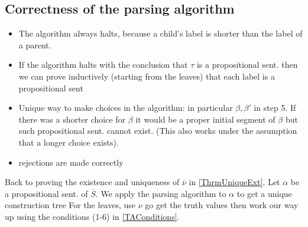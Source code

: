 \subsection*{Correctness of the parsing algorithm}
\begin{itemize}
    \item The algorithm always halts, because a child's label is shorter than the label of a parent.
    \item If the algorithm halts with the conclusion that $\tau$ is a propositional sent. 
    then we can prove inductively (starting from the leaves) that each label is a propositional sent
    \item Unique way to make choices in the algorithm: in particular $\beta, \beta'$ in step 5.
    If there was a shorter choice for $\beta$ it would be a proper initial segment of $\beta$ but such propositional sent. cannot exist.
    (This also works under the assumption that a longer choice exists).
    \item rejections are made correctly
\end{itemize}



Back to proving the existence and uniqueness of $\overline{\nu}$ in \ref{ThrmUniqueExt}.
Let $\alpha$ be a propositional sent. of $\overline{S}$. We apply the parsing algorithm to $\alpha$ to get a unique construction tree
For the leaves, use $\nu$ go get the truth values then work our way up using the conditions (1-6) in \ref{TAConditions}.
